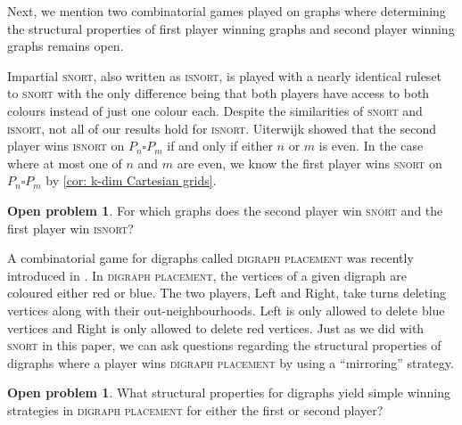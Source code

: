 \documentclass[11pt]{article}
\theoremstyle{definition}
\newtheorem{problem}[theorem]{Open problem}
\begin{document}
Next, we mention two combinatorial games played on graphs where determining the
structural properties of first player winning graphs and second player winning
graphs remains open. 

Impartial \textsc{snort}, also written as \textsc{isnort}, is played with a
nearly identical ruleset to \textsc{snort} with the only difference being that
both players have access to both colours instead of just one colour each.
Despite the similarities of \textsc{snort} and \textsc{isnort}, not all of our
results hold for \textsc{isnort}. Uiterwijk \cite{uiterwijk:solving2} showed
that the second player wins \textsc{isnort} on $P_n \square P_m$ if and only if
either $n$ or $m$ is even. In the case where at most one of $n$ and $m$ are
even, we know the first player wins \textsc{snort} on $P_n \square P_m$ by
\cref{cor: k-dim Cartesian grids}.

\begin{problem}
    For which graphs does the second player win \textsc{snort} and the first
    player win \textsc{isnort}?
\end{problem}

A combinatorial game for digraphs called \textsc{digraph placement} was
recently introduced in \cite{clow.mckay:digraph}. In \textsc{digraph
placement}, the vertices of a given digraph are coloured either red or blue.
The two players, Left and Right, take turns deleting vertices along with their
out-neighbourhoods. Left is only allowed to delete blue vertices and Right is
only allowed to delete red vertices. Just as we did with \textsc{snort} in this
paper, we can ask questions regarding the structural properties of digraphs
where a player wins \textsc{digraph placement} by using a ``mirroring''
strategy. 

\begin{problem}
    What structural properties for digraphs yield simple winning strategies in
    \textsc{digraph placement} for either the first or second player?
\end{problem}



\end{document}

